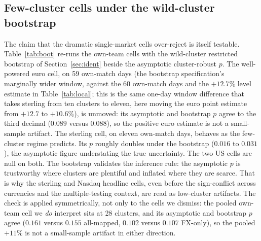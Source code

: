\documentclass[12pt]{article}
\begin{document}
\subsection{Few-cluster cells under the wild-cluster bootstrap}\label{sec:bootcells}
The claim that the dramatic single-market cells over-reject is itself testable. Table~\ref{tab:boot} re-runs the own-team cells with the wild-cluster restricted bootstrap of Section~\ref{sec:ident} beside the asymptotic cluster-robust $p$. The well-powered euro cell, on 59 own-match days (the bootstrap specification's marginally wider window, against the 60 own-match days and the $+12.7\%$ level estimate in Table~\ref{tab:local}; this is the same one-day window difference that takes sterling from ten clusters to eleven, here moving the euro point estimate from $+12.7$ to $+10.6\%$), is unmoved: its asymptotic and bootstrap $p$ agree to the third decimal ($0.089$ versus $0.088$), so the positive euro estimate is not a small-sample artifact. The sterling cell, on eleven own-match days, behaves as the few-cluster regime predicts. Its $p$ roughly doubles under the bootstrap ($0.016$ to $0.031$), the asymptotic figure understating the true uncertainty. The two US cells are null on both. The bootstrap validates the inference rule: the asymptotic $p$ is trustworthy where clusters are plentiful and inflated where they are scarce. That is why the sterling and Nasdaq headline cells, even before the sign-conflict across currencies and the multiple-testing context, are read as low-cluster artifacts. The check is applied symmetrically, not only to the cells we dismiss: the pooled own-team cell we \emph{do} interpret sits at 28 clusters, and its asymptotic and bootstrap $p$ agree ($0.161$ versus $0.155$ all-mapped, $0.102$ versus $0.107$ FX-only), so the pooled $+11\%$ is not a small-sample artifact in either direction.
\end{document}

